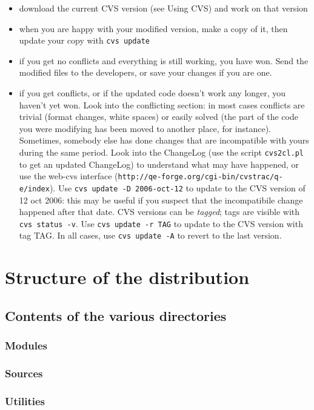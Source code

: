 \documentclass[12pt,a4paper]{article}
\begin{document}
\begin{itemize}
\item download the current CVS version (see Using CVS) and work on that version
\item when you are happy with your modified version, make a copy of
  it, then update your copy with \texttt{cvs update} 
\item if you get no conflicts and everything is still working, you
  have won. Send the modified files to the developers, or save
  your changes if you are one.
\item if you get conflicts, or if the updated code doesn't work any
  longer, you haven't yet won. Look into the conflicting section: in
  most cases conflicts are trivial (format changes, white spaces) or
  easily solved (the part of the code you were modifying has been
  moved to another place, for instance). Sometimes, somebody else has
  done changes that are incompatible with yours during the same
  period. Look into the ChangeLog (use the script \texttt{cvs2cl.pl}
  to get an updated ChangeLog) to understand what may have happened,
  or use the web-cvs interface
  (\texttt{http://qe-forge.org/cgi-bin/cvstrac/q-e/index}).
  Use \texttt{cvs update -D 2006-oct-12} to update to the CVS version 
  of 12 oct 2006: this may be useful if you suspect that the incompatibile 
  change happened after that date. CVS versions can be {\em tagged}; 
  tags are visible with \texttt{cvs status -v}. Use \texttt{cvs update -r TAG}
  to update to the CVS version with tag TAG. In all cases, use 
  \texttt{cvs update -A} to revert to the last version.
\end{itemize}

\section{ Structure of the distribution}
\subsection{Contents of the various directories}
\subsubsection{ Modules}
\subsubsection{ Sources}
\subsubsection{ Utilities}
\end{document}
